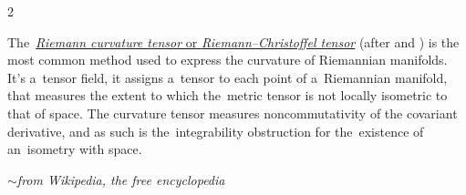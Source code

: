 \begin{changemargin}{2\parindent}{\parindent}
\bgroup %
\setlength{\parindent}{\negparindent}
\setlength{\parskip}{\spacebetweenparagraphs}
\small

\leavevmode{\indent}The~\href{https://en.wikipedia.org/wiki/Riemann_curvature_tensor}{\emph{Riemann curvature tensor} or \emph{Riemann\hbox{--}Christoffel tensor}} (after \href{https://en.wikipedia.org/wiki/Bernhard_Riemann}{} and \href{https://en.wikipedia.org/wiki/Elwin_Bruno_Christoffel}{}) is the most common method used to express the curvature of Riemannian manifolds. It’s a~tensor field, it assigns a~tensor to each point of a~Riemannian manifold, that measures the extent to which the~metric tensor is not locally isometric to that of  space. The curvature tensor measures noncommutativity of the covariant derivative, and as such is the~integrability obstruction for the~existence of an~isometry with  space.

\vspace{.2em}
\hfill $\sim$\:\emph{from Wikipedia, the free encyclopedia}
\par
\egroup
\nopagebreak\vspace{.12em}
\end{changemargin}

